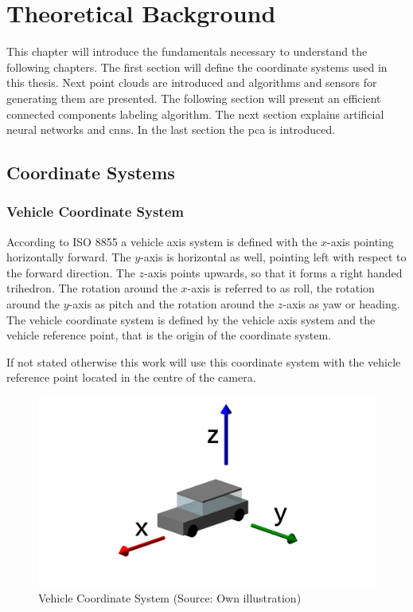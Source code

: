 \chapter{Theoretical Background} \label{sec:theo}
This chapter will introduce the fundamentals necessary to understand the following chapters. The first section will define the coordinate systems used in this thesis.
Next point clouds are introduced  and algorithms and sensors for generating them are presented.
The following section will present an efficient connected components labeling algorithm.
The next section explains artificial neural networks and \acp{cnn}.
In the last section the \ac{pca} is introduced.

\section{Coordinate Systems} 
\subsection{Vehicle Coordinate System} \label{sec:theo:vehicleCoord}
According to ISO 8855 \cite{ISO8855} 
a vehicle axis system is defined with the $x$-axis pointing horizontally forward. 
The $y$-axis is horizontal as well, pointing left with respect to the forward direction. The $z$-axis points upwards, so that it forms a right handed trihedron. The rotation around the $x$-axis is referred to as roll, the rotation around the $y$-axis as pitch and the rotation around the $z$-axis as yaw or heading.
The vehicle coordinate system is defined by the vehicle axis system and the vehicle reference point, that is the origin of the coordinate system.

If not stated otherwise this work will use this coordinate system with the vehicle reference point located in the centre of the camera.

\begin{figure}[h!]
    \centering
    \includegraphics[width=\textwidth]{coord.png}
    \caption{Vehicle Coordinate System (Source: Own illustration)}
    \label{fig:theo:coord}
\end{figure}


